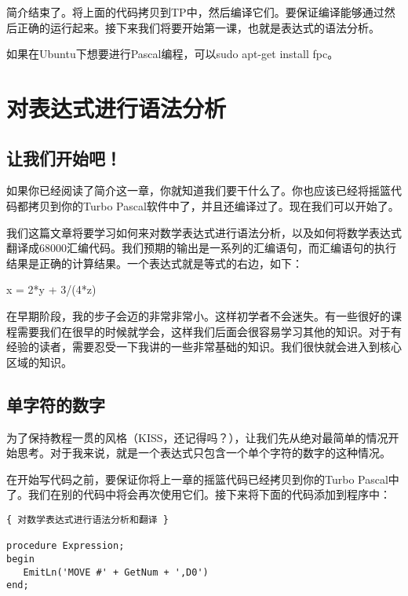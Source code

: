简介结束了。将上面的代码拷贝到TP中，然后编译它们。要保证编译能够通过然后正确的运行起来。接下来我们将要开始第一课，也就是表达式的语法分析。

\begin{tcolorbox}
   \begin{note}
      如果在Ubuntu下想要进行Pascal编程，可以sudo apt-get install fpc。
   \end{note}
\end{tcolorbox}

\chapter{对表达式进行语法分析}

\section{让我们开始吧！}

如果你已经阅读了简介这一章，你就知道我们要干什么了。你也应该已经将摇篮代码都拷贝到你的Turbo Pascal软件中了，并且还编译过了。现在我们可以开始了。

我们这篇文章将要学习如何来对数学表达式进行语法分析，以及如何将数学表达式翻译成68000汇编代码。我们预期的输出是一系列的汇编语句，而汇编语句的执行结果是正确的计算结果。一个表达式就是等式的右边，如下：

\begin{tcolorbox}
x = 2*y + 3/(4*z)
\end{tcolorbox}

在早期阶段，我的步子会迈的非常非常小。这样初学者不会迷失。有一些很好的课程需要我们在很早的时候就学会，这样我们后面会很容易学习其他的知识。对于有经验的读者，需要忍受一下我讲的一些非常基础的知识。我们很快就会进入到核心区域的知识。

\section{单字符的数字}

为了保持教程一贯的风格（KISS，还记得吗？），让我们先从绝对最简单的情况开始思考。对于我来说，就是一个表达式只包含一个单个字符的数字的这种情况。

在开始写代码之前，要保证你将上一章的摇篮代码已经拷贝到你的Turbo Pascal中了。我们在别的代码中将会再次使用它们。接下来将下面的代码添加到程序中：

\begin{verbatim}
{ 对数学表达式进行语法分析和翻译 }

procedure Expression;
begin
   EmitLn('MOVE #' + GetNum + ',D0')
end;
\end{verbatim}


